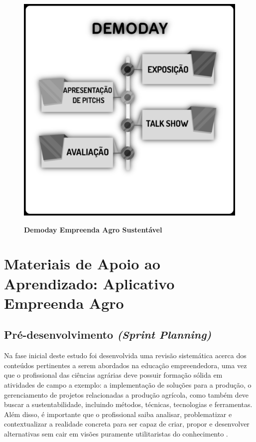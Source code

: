 \begin{figure}[H]
\centering
\caption{\textbf{Demoday Empreenda Agro Sustentável}}
\includegraphics[scale=0.2]{Imagens/workshop-04.png}
\label{figura_33}
\end{figure}


\section{Materiais de Apoio ao Aprendizado: Aplicativo Empreenda Agro}


\subsection{Pré-desenvolvimento \textit{(Sprint Planning)}}

Na fase inicial deste estudo foi desenvolvida uma revisão sistemática acerca dos conteúdos pertinentes a serem abordados na educação empreendedora, uma vez que o profissional das ciências agrárias deve possuir formação sólida em atividades de campo a exemplo: a implementação de soluções para a produção, o gerenciamento de projetos relacionadas a produção agrícola, como também deve buscar a sustentabilidade, incluindo métodos, técnicas, tecnologias e ferramentas. Além disso, é importante que o profissional saiba analisar, problematizar e contextualizar a realidade concreta para ser capaz de criar, propor e desenvolver alternativas sem cair em visões puramente utilitaristas do conhecimento \cite{cavalcanti_da_2019}.

